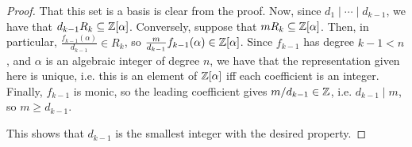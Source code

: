 \begin{proof} 
    That this set is a basis is clear from the proof. Now, since $d_1 \mid \cdots \mid d_{k-1}$, we have that $d_{k-1}R_k \subseteq \mathbb{Z}[\alpha]$. Conversely, suppose that $mR_k \subseteq \mathbb{Z}[\alpha]$. Then, in particular, $\frac{f_{k-1}(\alpha)}{d_{k-1}} \in R_k$, so $\frac{m}{d_{k-1}}f_{k-1}(\alpha) \in \mathbb{Z}[\alpha]$. Since $f_{k-1}$ has degree $k-1 < n$, and $\alpha$ is an algebraic integer of degree $n$, we have that the representation given here is unique, i.e. this is an element of $\mathbb{Z}[\alpha]$ iff each coefficient is an integer. Finally, $f_{k-1}$ is monic, so the leading coefficient gives $m/d_{k-1} \in \mathbb{Z}$, i.e. $d_{k-1} \mid m$, so $m \geq d_{k-1}$.

    This shows that $d_{k-1}$ is the smallest integer with the desired property.
\end{proof}
